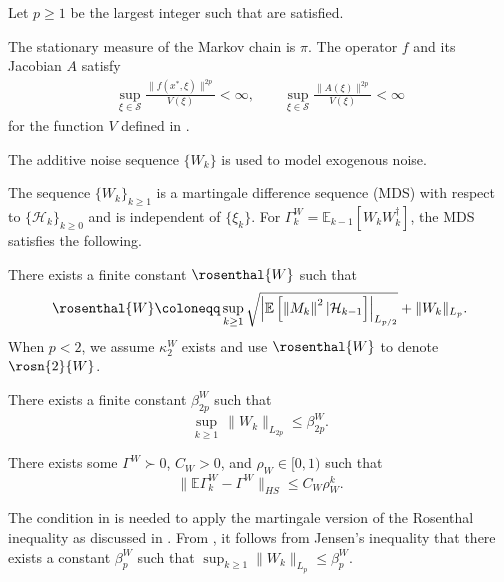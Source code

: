 \documentclass[11pt]{article}
\begin{document}
Let $p \geq 1$ be the largest integer such that  are satisfied.
\begin{assumption}\label{ass:noise_operator_compatibility}
    The stationary measure of the Markov chain is $\pi$. 
    The operator $f$ and its Jacobian $A$ satisfy
        \begin{align*}
            \sup_{\xi \in \mathcal{S}} \frac{\lVert f(x^*, \xi) \rVert^{2p}}{V(\xi)} < \infty , 
            \qquad
            \sup_{\xi \in \mathcal{S}} \frac{\lVert A(\xi) \rVert^{2p}}{V(\xi)} < \infty 
        \end{align*}
        for the function $V$ defined in .
\end{assumption}
The additive noise sequence $\{W_k\}$ is used to model exogenous noise. 
\begin{assumption}\label{ass:noise_martingale}
    The sequence $\{W_k\}_{k \geq 1}$ is a martingale difference sequence (MDS) with respect to $\{\mathcal{H}_{k}\}_{k \geq 0}$ and is independent of $\{\xi_k\}$. 
    For $\Gamma_k^W = \mathbb{E}_{k-1} [W_k W_k^\dagger]$, the MDS satisfies the following.
    \begin{assumptionsub}
        \item There exists a finite constant $\rosenthal{W}$ such that        
        \begin{equation*}
        \rosenthal{W} \coloneqq \sup_{k \geq 1} \sqrt{\left\lvert 
        \mathbb{E}\left[  \left\lVert M_k \right\rVert^2 | \mathcal{H}_{k-1} \right]
        \right\rvert_{L_{p/2 }}} + \lVert W_k \rVert_{L_{p}} 
        .
    \end{equation*} 
    When $p < 2$, we assume $\kappa_2^W$ exists and use $\rosenthal{W}$ to denote $\rosn{2}{W}$. 

    \label{ass:martingale:rosenthal}

    \item 
    There exists a finite constant $\beta_{2p}^W$ such that
    \begin{equation*}
        \sup_{k \geq 1}\,  \lVert W_k \rVert_{L_{2p}} \leq \beta_{2p}^W . 
    \end{equation*}
    \label{ass:martingale:moments}

        \item  
        There exists some $\Gamma^W \succ 0$, $C_W > 0$, and $\rho_W \in [0, 1)$ such that
    \begin{equation*}
        \lVert \mathbb{E}\Gamma_k^W - \Gamma^W \rVert_{HS} \leq C_W \rho_W^k .
    \end{equation*}
    \label{ass:martingale:covariance}
    \end{assumptionsub}
\end{assumption}
The condition in  is needed to apply the martingale version of the Rosenthal inequality as discussed in .
From , it follows from Jensen's inequality that there exists a constant $\beta_p^W$ such that $\sup_{k \geq 1} \lVert W_k \rVert_{L_p} \leq \beta_p^W$. 
\end{document}
